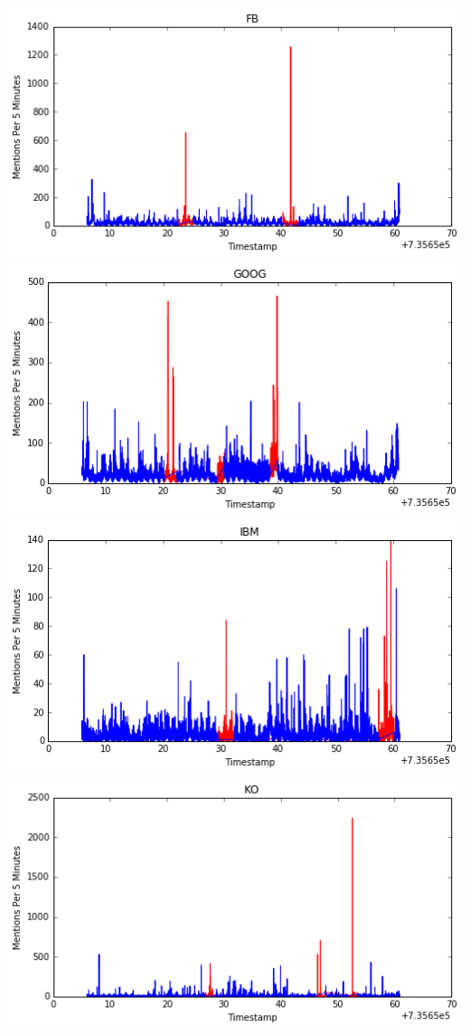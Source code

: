 \documentclass[11pt, margin=1in]{article}
\begin{document}
\begin{center}
\includegraphics[scale=0.4]{img/fb.png}
\includegraphics[scale=0.4]{img/goog.png}
\includegraphics[scale=0.4]{img/ibm.png}
\includegraphics[scale=0.4]{img/ko.png}

\end{center}
\end{document}
